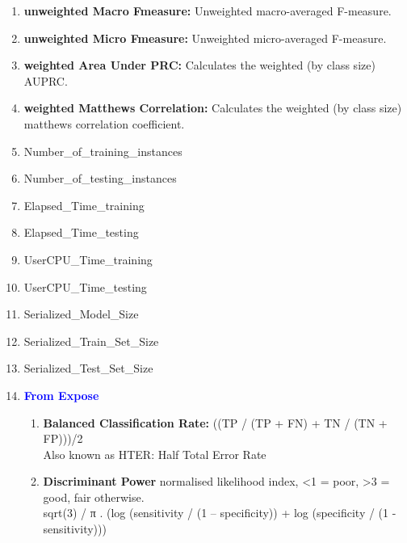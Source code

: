 \documentclass[a4paper,12pt, english]{article}
\begin{document}
\begin{enumerate}
             

\item \textbf{unweighted Macro Fmeasure: }
          Unweighted macro-averaged F-measure.
          
\item \textbf{unweighted Micro Fmeasure: }
          Unweighted micro-averaged F-measure.          

\item \textbf{weighted Area Under PRC: }
          Calculates the weighted (by class size) AUPRC.


          
\item \textbf{weighted Matthews Correlation: }
          Calculates the weighted (by class size) matthews correlation coefficient.
          
\item Number\_of\_training\_instances

\item Number\_of\_testing\_instances          

\item Elapsed\_Time\_training

\item Elapsed\_Time\_testing

\item UserCPU\_Time\_training

\item UserCPU\_Time\_testing
    
\item Serialized\_Model\_Size

\item Serialized\_Train\_Set\_Size

\item Serialized\_Test\_Set\_Size
	    


\item  \textbf{\textcolor{blue}{From Expose}}
\begin{enumerate}          
\item \textbf{Balanced Classification Rate: }
((TP / (TP + FN) + TN / (TN + FP)))/2\\
Also known as HTER: Half Total Error Rate

          
\item \textbf{Discriminant Power }
          normalised likelihood index, <1 = poor, >3 = good, fair otherwise. \\
sqrt(3) / π . (log (sensitivity / (1 – specificity)) + log (specificity / (1 - sensitivity)))


\end{enumerate}
\end{enumerate}
\end{document}
